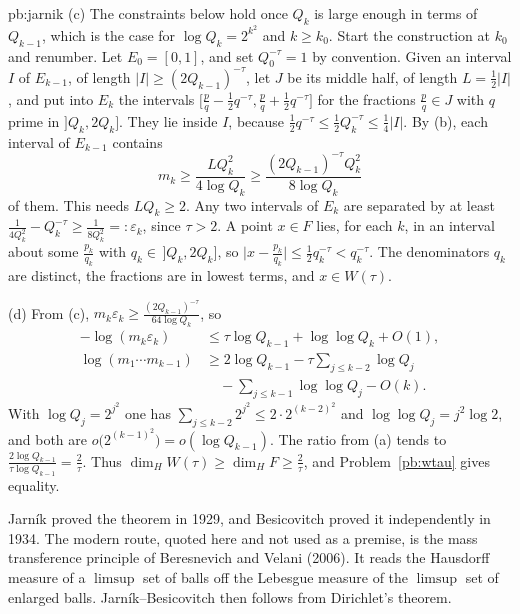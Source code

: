 \begin{solution}{pb:jarnik}
(c) The constraints below hold once $Q_k$ is large enough in terms of $Q_{k-1}$, which is the case for $\log Q_k=2^{k^2}$ and $k\ge k_0$. Start the construction at $k_0$ and renumber. Let $E_0=[0,1]$, and set $Q_0^{-\tau}=1$ by convention. Given an interval $I$ of $E_{k-1}$, of length $|I|\ge(2Q_{k-1})^{-\tau}$, let $J$ be its middle half, of length $L=\frac12|I|$, and put into $E_k$ the intervals $\bigl[\frac pq-\frac12 q^{-\tau},\frac pq+\frac12 q^{-\tau}\bigr]$ for the fractions $\frac pq\in J$ with $q$ prime in $]Q_k,2Q_k]$. They lie inside $I$, because $\frac12 q^{-\tau}\le\frac12 Q_k^{-\tau}\le\frac14|I|$. By (b), each interval of $E_{k-1}$ contains
\[
m_k\ge\frac{LQ_k^2}{4\log Q_k}\ge\frac{(2Q_{k-1})^{-\tau}Q_k^2}{8\log Q_k}
\]
of them. This needs $LQ_k\ge 2$. Any two intervals of $E_k$ are separated by at least $\frac1{4Q_k^2}-Q_k^{-\tau}\ge\frac1{8Q_k^2}=:\varepsilon_k$, since $\tau>2$. A point $x\in F$ lies, for each $k$, in an interval about some $\frac{p_k}{q_k}$ with $q_k\in\,]Q_k,2Q_k]$, so $\bigl|x-\frac{p_k}{q_k}\bigr|\le\frac12 q_k^{-\tau}<q_k^{-\tau}$. The denominators $q_k$ are distinct, the fractions are in lowest terms, and $x\in W(\tau)$.

(d) From (c), $m_k\varepsilon_k\ge\frac{(2Q_{k-1})^{-\tau}}{64\log Q_k}$, so
\[
\begin{aligned}
-\log(m_k\varepsilon_k)&\le\tau\log Q_{k-1}+\log\log Q_k+O(1),\\
\log(m_1\cdots m_{k-1})&\ge 2\log Q_{k-1}-\tau\sum_{j\le k-2}\log Q_j\\
&\quad-\sum_{j\le k-1}\log\log Q_j-O(k).
\end{aligned}
\]
With $\log Q_j=2^{j^2}$ one has $\sum_{j\le k-2}2^{j^2}\le 2\cdot 2^{(k-2)^2}$ and $\log\log Q_j=j^2\log 2$, and both are $o\bigl(2^{(k-1)^2}\bigr)=o(\log Q_{k-1})$. The ratio from (a) tends to $\frac{2\log Q_{k-1}}{\tau\log Q_{k-1}}=\frac2\tau$. Thus $\dim_HW(\tau)\ge\dim_HF\ge\frac2\tau$, and Problem~\ref{pb:wtau} gives equality.

\leads Jarník proved the theorem in 1929, and Besicovitch proved it independently in 1934. The modern route, quoted here and not used as a premise, is the mass transference principle of Beresnevich and Velani (2006). It reads the Hausdorff measure of a $\limsup$ set of balls off the Lebesgue measure of the $\limsup$ set of enlarged balls. Jarník--Besicovitch then follows from Dirichlet's theorem.
\end{solution}


